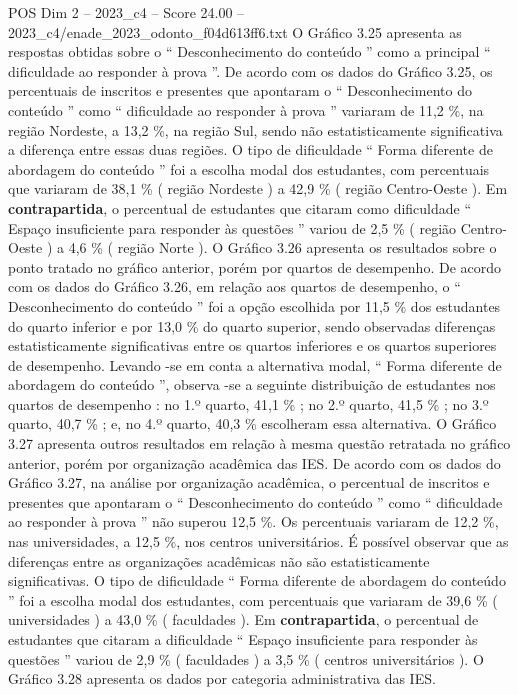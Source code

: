 \begin{textsample}{POS Dim 2 – 2023\_c4 – Score 24.00 – 2023\_c4/enade\_2023\_odonto\_f04d613ff6.txt}
O Gráfico 3.25 apresenta as respostas obtidas sobre o “ Desconhecimento do conteúdo ” como a principal “ dificuldade ao responder à prova ”.
De acordo com os dados do Gráfico 3.25, os percentuais de inscritos e presentes que apontaram o “ Desconhecimento do conteúdo ” como “ dificuldade ao responder à prova ” variaram de 11,2 \%, na região Nordeste, a 13,2 \%, na região Sul, sendo não estatisticamente significativa a diferença entre essas duas regiões.
O tipo de dificuldade “ Forma diferente de abordagem do conteúdo ” foi a escolha modal dos estudantes, com percentuais que variaram de 38,1 \% ( região Nordeste ) a 42,9 \% ( região Centro-Oeste ).
Em \textbf{contrapartida}, o percentual de estudantes que citaram como dificuldade “ Espaço insuficiente para responder às questões ” variou de 2,5 \% ( região Centro-Oeste ) a 4,6 \% ( região Norte ).
O Gráfico 3.26 apresenta os resultados sobre o ponto tratado no gráfico anterior, porém por quartos de desempenho.
De acordo com os dados do Gráfico 3.26, em relação aos quartos de desempenho, o “ Desconhecimento do conteúdo ” foi a opção escolhida por 11,5 \% dos estudantes do quarto inferior e por 13,0 \% do quarto superior, sendo observadas diferenças estatisticamente significativas entre os quartos inferiores e os quartos superiores de desempenho.
Levando -se em conta a alternativa modal, “ Forma diferente de abordagem do conteúdo ”, observa -se a seguinte distribuição de estudantes nos quartos de desempenho : no 1.º quarto, 41,1 \% ; no 2.º quarto, 41,5 \% ; no 3.º quarto, 40,7 \% ; e, no 4.º quarto, 40,3 \% escolheram essa alternativa.
O Gráfico 3.27 apresenta outros resultados em relação à mesma questão retratada no gráfico anterior, porém por organização acadêmica das IES.
De acordo com os dados do Gráfico 3.27, na análise por organização acadêmica, o percentual de inscritos e presentes que apontaram o “ Desconhecimento do conteúdo ” como “ dificuldade ao responder à prova ” não superou 12,5 \%.
Os percentuais variaram de 12,2 \%, nas universidades, a 12,5 \%, nos centros universitários.
É possível observar que as diferenças entre as organizações acadêmicas não são estatisticamente significativas.
O tipo de dificuldade “ Forma diferente de abordagem do conteúdo ” foi a escolha modal dos estudantes, com percentuais que variaram de 39,6 \% ( universidades ) a 43,0 \% ( faculdades ).
Em \textbf{contrapartida}, o percentual de estudantes que citaram a dificuldade “ Espaço insuficiente para responder às questões ” variou de 2,9 \% ( faculdades ) a 3,5 \% ( centros universitários ).
O Gráfico 3.28 apresenta os dados por categoria administrativa das IES.

\end{textsample}
